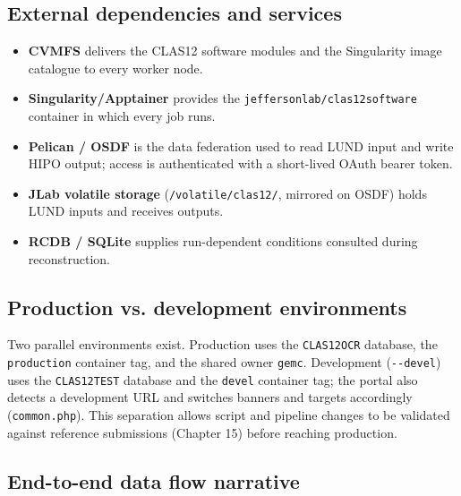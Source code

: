 \subsection{External dependencies and services}

\begin{itemize}
  \item \textbf{CVMFS} delivers the CLAS12 software modules and the Singularity image catalogue to every worker
  node.
  \item \textbf{Singularity/Apptainer} provides the \texttt{jeffersonlab/\allowbreak{}clas12software} container
  in which every job runs.
  \item \textbf{Pelican / OSDF} is the data federation used to read LUND input and write HIPO output; access is
  authenticated with a short-lived OAuth bearer token.
  \item \textbf{JLab volatile storage} (\texttt{/\allowbreak{}volatile/\allowbreak{}clas12/\allowbreak{}},
  mirrored on OSDF) holds LUND inputs and receives outputs.
  \item \textbf{RCDB / SQLite} supplies run-dependent conditions consulted during reconstruction.
\end{itemize}

\subsection{Production vs. development environments}

Two parallel environments exist. Production uses the \texttt{CLAS12OCR} database, the \texttt{production}
container tag, and the shared owner \texttt{gemc}. Development (\texttt{-\allowbreak{}-\allowbreak{}devel})
uses the \texttt{CLAS12TEST} database and the \texttt{devel} container tag; the portal also detects a
development URL and switches banners and targets accordingly (\texttt{common.\allowbreak{}php}). This
separation allows script and pipeline changes to be validated against reference submissions (Chapter 15) before
reaching production.

\subsection{End-to-end data flow narrative}

